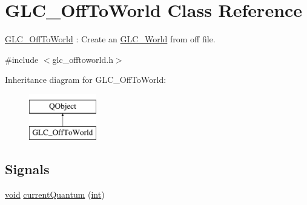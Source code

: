 \hypertarget{class_g_l_c___off_to_world}{\section{G\-L\-C\-\_\-\-Off\-To\-World Class Reference}
\label{class_g_l_c___off_to_world}
}


\hyperlink{class_g_l_c___off_to_world}{G\-L\-C\-\_\-\-Off\-To\-World} \-: Create an \hyperlink{class_g_l_c___world}{G\-L\-C\-\_\-\-World} from off file.  




{\ttfamily \#include $<$glc\-\_\-offtoworld.\-h$>$}

Inheritance diagram for G\-L\-C\-\_\-\-Off\-To\-World\-:\begin{figure}[H]
\begin{center}
\leavevmode
\includegraphics[height=2.000000cm]{class_g_l_c___off_to_world}
\end{center}
\end{figure}
\subsection*{Signals}
\begin{DoxyCompactItemize}
\item 
\hyperlink{group___u_a_v_objects_plugin_ga444cf2ff3f0ecbe028adce838d373f5c}{void} \hyperlink{class_g_l_c___off_to_world_acd9b930f772eb1d2a3a4092fd9eba30a}{current\-Quantum} (\hyperlink{ioapi_8h_a787fa3cf048117ba7123753c1e74fcd6}{int})
\end{DoxyCompactItemize}
